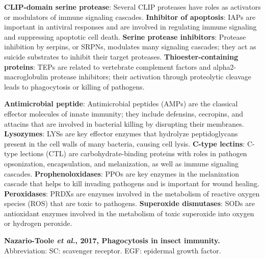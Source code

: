 \documentclass[11pt]{article}
\begin{document}
\begin{sloppypar}
\textbf{CLIP-domain serine protease}: Several CLIP proteases have roles as activators or modulators of
immune signaling cascades. \newline
\textbf{Inhibitor of apoptosis}: IAPs are important in antiviral responses and are involved in regulating immune signaling and suppressing apoptotic cell death. \newline
\textbf{Serine protease inhibitors}: Protease inhibition by serpins, or SRPNs, modulates many
signaling cascades; they act as suicide substrates to inhibit their target proteases. \newline
\textbf{Thioester-containing proteins}: TEPs are related to vertebrate complement factors and
alpha2-macroglobulin protease inhibitors; their activation through proteolytic cleavage leads to phagocytosis or killing of pathogens. \newline
\par
\textbf{Antimicrobial peptide}: Antimicrobial peptides (AMPs) are the classical effector molecules of innate immunity; they include defensins, cecropins, and attacins that are involved in bacterial killing by disrupting their membranes. \newline
\textbf{Lysozymes}: LYSs are key effector enzymes that hydrolyze peptidoglycans present in the cell walls of many bacteria, causing cell lysis. \newline
\textbf{C-type lectins}: C-type lections (CTL) are carbohydrate-­binding proteins with roles in pathogen opsonization, encapsulation, and melanization, as well as immune signaling cascades. \newline
\textbf{Prophenoloxidases}: PPOs are key enzymes in the melanization cascade that helps to
kill invading pathogens and is important for wound healing. \newline
\textbf{Peroxidases}: PRDXs are enzymes involved in the metabolism of reactive oxygen species (ROS) that are toxic to pathogens. \newline
\textbf{Superoxide dismutases}: SODs are antioxidant enzymes involved in the metabolism of toxic superoxide into oxygen or hydrogen peroxide.
\par \newline \newline
\textbf{Nazario-Toole \textit{et al.}, 2017, Phagocytosis in insect immunity.}
Abbreviation: \newline
SC: scavenger receptor.\newline
EGF: epidermal growth factor.\newline

\end{sloppypar}
\end{document}
